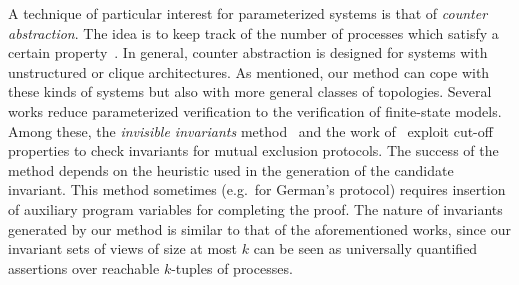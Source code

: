 A technique of particular interest for parameterized systems is that
of {\it counter abstraction}. The idea is to keep track of the number
of processes which satisfy a certain
property~\cite{GerSis:many,Esparza:Finkel:Mayr:LICS,Delzanno:cache,Delzanno:futurebus,PXZ02}.
%
In general, counter abstraction is designed for systems with
unstructured or clique architectures.
%
As mentioned, our method can cope with these kinds of systems but also
with more general classes of topologies.
%
Several works reduce parameterized verification to the verification of
finite-state models. Among these, the {\em invisible invariants}
method~\cite{APRXZ01,PRZ-tacas01} and the work of~\cite{Namjoshi:VMCAI07} exploit cut-off properties to check
invariants for mutual exclusion protocols. %
%
The success of the method depends on the heuristic used in the
generation of the candidate invariant. This method sometimes (e.g.\
for German's protocol) requires insertion of auxiliary program
variables for completing the proof. 
The nature of invariants generated by our method is similar to that of the aforementioned works, since our invariant sets of views of size at most $k$ can be seen as universally quantified assertions over reachable $k$-tuples of processes.  
%

